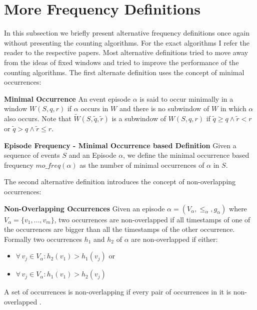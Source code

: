 \section{More Frequency Definitions}
\label{sec_otherFrequency}

In this subsection we briefly present alternative frequency definitions once again without presenting the counting algorithms. For the exact algorithms I refer the reader to the respective papers. \newline
Most alternative definitions tried to move away from the ideas of fixed windows and tried to improve the performance of the counting algorithms. The first alternate definition uses the concept of minimal occurrences:

\begin{mydef}
\textbf{Minimal Occurrence} An event episode $\alpha$ is said to occur minimally in a window $W(S,q,r)$ if $\alpha$ occurs in $W$ and there is no subwindow of $W$ in which $\alpha$ also occurs. Note that $\tilde{W}(S,\tilde{q},\tilde{r})$ is a subwindow of $W(S,q,r)$ if $\tilde{q} \geq q \land \tilde{r} < r $ or $\tilde{q} > q \land \tilde{r} \leq r $.
\end{mydef}

\begin{mydef}
\label{def_minimalOccuranceFrequency}
\textbf{Episode Frequency - Minimal Occurrence based Definition} Given a sequence of events $S$ and an Episode $\alpha$, we define the minimal occurrence based frequency $mo\_freq(\alpha )$ as the number of minimal occurrences of $\alpha$ in $S$. \cite{laxman2006discovering}
\end{mydef}

The second alternative definition introduces the concept of non-overlapping occurrences:

\begin{mydef}
\textbf{Non-Overlapping Occurrences} Given an episode $\alpha = (V_\alpha,{\leq}_{\alpha},g_\alpha)$ where $V_\alpha = \{v_1,...,v_m\}$, two occurrences are non-overlapped if all timestamps of one of the occurrences are bigger than all the timestamps of the other occurrence. Formally two occurrences $h_1$ and $h_2$ of $\alpha$ are non-overlapped if either:
\begin{itemize}
	\item $\forall \, v_j \in V_\alpha : h_2(v_1)>h_1(v_j)$ or 
	\item $\forall \, v_j \in V_\alpha : h_1(v_1)>h_2(v_j)$
\end{itemize}
A set of occurrences is non-overlapping if every pair of occurrences in it is non-overlapped \cite{laxman2007fast}.
\end{mydef}


